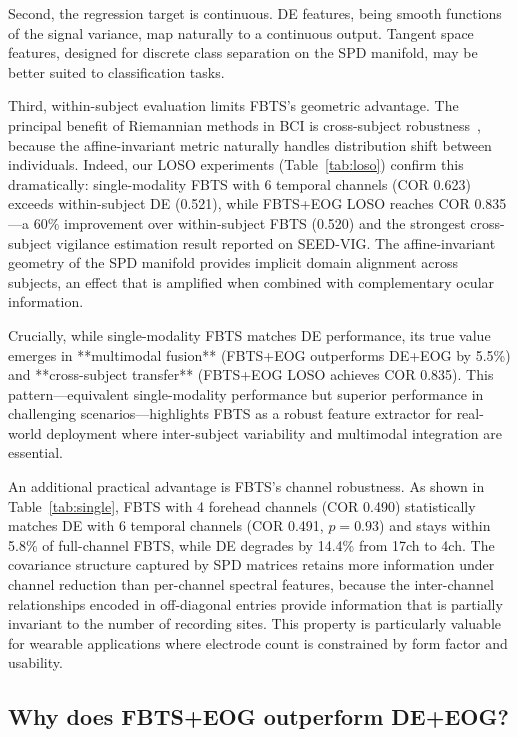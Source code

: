 \documentclass{iopjournal}
\begin{document}
Second, the regression target is continuous. DE features, being smooth functions of the signal variance, map naturally to a continuous output. Tangent space features, designed for discrete class separation on the SPD manifold, may be better suited to classification tasks.

Third, within-subject evaluation limits FBTS's geometric advantage. The principal benefit of Riemannian methods in BCI is cross-subject robustness~\cite{zanini2018transfer}, because the affine-invariant metric naturally handles distribution shift between individuals. Indeed, our LOSO experiments (Table~\ref{tab:loso}) confirm this dramatically: single-modality FBTS with 6 temporal channels (COR 0.623) exceeds within-subject DE (0.521), while FBTS+EOG LOSO reaches COR 0.835---a 60\% improvement over within-subject FBTS (0.520) and the strongest cross-subject vigilance estimation result reported on SEED-VIG. The affine-invariant geometry of the SPD manifold provides implicit domain alignment across subjects, an effect that is amplified when combined with complementary ocular information.

Crucially, while single-modality FBTS matches DE performance, its true value emerges in **multimodal fusion** (FBTS+EOG outperforms DE+EOG by 5.5\%) and **cross-subject transfer** (FBTS+EOG LOSO achieves COR 0.835). This pattern---equivalent single-modality performance but superior performance in challenging scenarios---highlights FBTS as a robust feature extractor for real-world deployment where inter-subject variability and multimodal integration are essential.

An additional practical advantage is FBTS's channel robustness. As shown in Table~\ref{tab:single}, FBTS with 4 forehead channels (COR 0.490) statistically matches DE with 6 temporal channels (COR 0.491, $p=0.93$) and stays within 5.8\% of full-channel FBTS, while DE degrades by 14.4\% from 17ch to 4ch. The covariance structure captured by SPD matrices retains more information under channel reduction than per-channel spectral features, because the inter-channel relationships encoded in off-diagonal entries provide information that is partially invariant to the number of recording sites. This property is particularly valuable for wearable applications where electrode count is constrained by form factor and usability.

\subsection{Why does FBTS+EOG outperform DE+EOG?}
\end{document}
